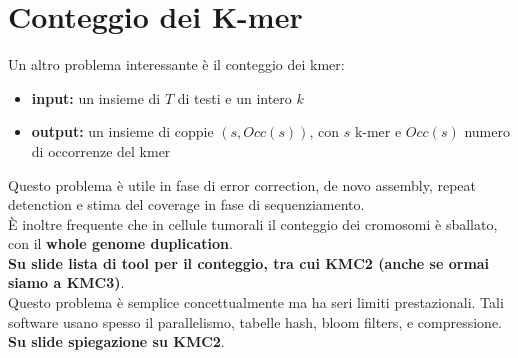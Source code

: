 \documentclass[a4paper,12pt, oneside]{book}
\begin{document}
\section{Conteggio dei K-mer}
Un altro problema interessante è il conteggio dei kmer:
\begin{itemize}
  \item \textbf{input:} un insieme di $T$ di testi e un intero $k$
  \item \textbf{output:} un insieme di coppie $(s,Occ(s))$, con $s$ k-mer e
  $Occ(s)$ numero di occorrenze del kmer
\end{itemize}
Questo problema è utile in fase di error correction, de novo assembly, repeat
detenction e stima del coverage in fase di sequenziamento. \\
È inoltre frequente che in cellule tumorali il conteggio dei cromosomi è
sballato, con il \textbf{whole genome duplication}.\\
\textbf{Su slide lista di tool per il conteggio, tra cui KMC2 (anche se ormai
  siamo a KMC3)}.\\
Questo problema è semplice concettualmente ma ha seri limiti prestazionali.
Tali software usano spesso il parallelismo, tabelle hash, bloom filters, e
compressione.
\textbf{Su slide spiegazione su KMC2}.
\end{document}
